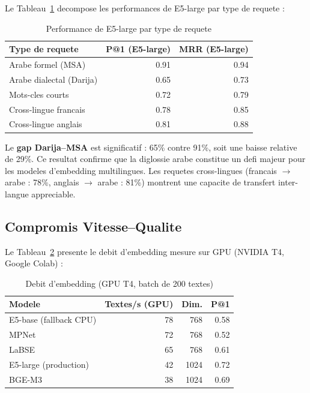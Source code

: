 Le Tableau~\ref{tab:embed-by-type} decompose les performances de E5-large par type de requete :

\begin{table}[h]
\centering
\renewcommand{\arraystretch}{1.3}
\begin{tabular}{|l|r|r|}
\hline
\rowcolor{LightBlue}
\textbf{\color{PrimaryBlue}Type de requete} & \textbf{\color{PrimaryBlue}P@1 (E5-large)} & \textbf{\color{PrimaryBlue}MRR (E5-large)} \\
\hline
Arabe formel (MSA) & 0.91 & 0.94 \\
Arabe dialectal (Darija) & 0.65 & 0.73 \\
Mots-cles courts & 0.72 & 0.79 \\
Cross-lingue francais & 0.78 & 0.85 \\
Cross-lingue anglais & 0.81 & 0.88 \\
\hline
\end{tabular}
\caption{Performance de E5-large par type de requete}
\label{tab:embed-by-type}
\end{table}

Le \textbf{gap Darija--MSA} est significatif : 65\% contre 91\%, soit une baisse relative de 29\%. Ce resultat confirme que la diglossie arabe constitue un defi majeur pour les modeles d'embedding multilingues. Les requetes cross-lingues (francais $\to$ arabe : 78\%, anglais $\to$ arabe : 81\%) montrent une capacite de transfert inter-langue appreciable.

\subsection{Compromis Vitesse--Qualite}

Le Tableau~\ref{tab:embed-speed} presente le debit d'embedding mesure sur GPU (NVIDIA T4, Google Colab) :

\begin{table}[h]
\centering
\renewcommand{\arraystretch}{1.3}
\begin{tabular}{|l|r|r|r|}
\hline
\rowcolor{LightBlue}
\textbf{\color{PrimaryBlue}Modele} & \textbf{\color{PrimaryBlue}Textes/s (GPU)} & \textbf{\color{PrimaryBlue}Dim.} & \textbf{\color{PrimaryBlue}P@1} \\
\hline
E5-base (fallback CPU) & 78 & 768 & 0.58 \\
MPNet & 72 & 768 & 0.52 \\
LaBSE & 65 & 768 & 0.61 \\
E5-large (production) & 42 & 1024 & 0.72 \\
BGE-M3 & 38 & 1024 & 0.69 \\
\hline
\end{tabular}
\caption{Debit d'embedding (GPU T4, batch de 200 textes)}
\label{tab:embed-speed}
\end{table}

